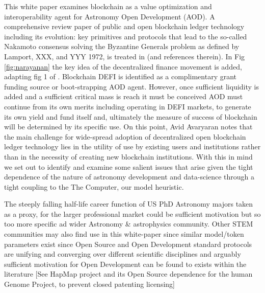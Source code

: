 \documentclass[final,5p,times,twocolumn,authoryear]{elsarticle}
\begin{document}
This white paper examines blockchain as a value optimization and interoperability agent for Astronomy Open Development (AOD). A comprehensive review paper of public and open blockchain ledger technology including its evolution: key primitives and protocols that lead to the so-called Nakamoto consensus solving the Byzantine Generals problem as defined by Lamport, XXX, and YYY 1972, is treated in  \cite{20d30b4efb014b21b7ab27f5218692ab} (and references therein). In Fig \ref{fig:narayanan} the key idea of the decentralized finance movement is added, adapting fig 1 of \cite{20d30b4efb014b21b7ab27f5218692ab}. Blockchain DEFI is identified as a complimentary grant funding source or boot-strapping AOD agent. However, once sufficient liquidity is added and a sufficient critical mass is reach it must be conceived AOD must continue from its own merits including operating in DEFI markets, to generate its own yield and fund itself and, ultimately the measure of success of blockchain will be determined by its specific use. On this point, Avid Avaryaran notes that the main challenge for wide-spread adoption of decentralized open blockchain ledger technology lies in the utility of use by existing users and institutions rather than in the necessity of creating new blockchain institutions. With this in mind we set out to identify and examine some salient issues that arise given the tight dependence of the nature of astronomy development and data-science through a tight coupling to the The Computer, our model heuristic.

The steeply falling half-life career function \cite{milo_2018} of US PhD Astronomy majors taken as a proxy, for the larger professional market could be sufficient motivation but so too more specific ad wider Astronomy \& astrophysics community. Other STEM communities may also find use in this white-paper since similar model/token parameters exist since Open Source and Open Development standard protocols are unifying and converging over different scientific disciplines and arguably sufficient motivation for Open Development can be found to exists within the literature [See HapMap project and its Open Source dependence for the human Genome Project, \cite{GITTER2008529} to prevent closed patenting licensing]

\end{document}
